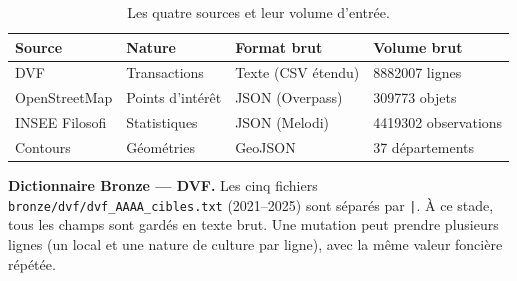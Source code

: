 \documentclass[11pt,a4paper]{article}
\begin{document}
\begin{table}[H]
\centering
\caption{Les quatre sources et leur volume d'entrée.}
\begin{tabular}{@{}l l l R{3cm}@{}}
\toprule
Source & Nature & Format brut & Volume brut \\
\midrule
DVF & Transactions & Texte (CSV étendu) & \num{8882007} lignes \\
OpenStreetMap & Points d'intérêt & JSON (Overpass) & \num{309773} objets \\
INSEE Filosofi & Statistiques & JSON (Melodi) & \num{4419302} observations \\
Contours & Géométries & GeoJSON & \num{37} départements \\
\bottomrule
\end{tabular}
\end{table}

\noindent\textbf{Dictionnaire Bronze --- DVF.} Les cinq fichiers \texttt{bronze/dvf/dvf\_AAAA\_cibles.txt} (2021--2025) sont séparés par \texttt{|}. À ce stade, tous les champs sont gardés en texte brut. Une mutation peut prendre plusieurs lignes (un local et une nature de culture par ligne), avec la même valeur foncière répétée.
\end{document}

